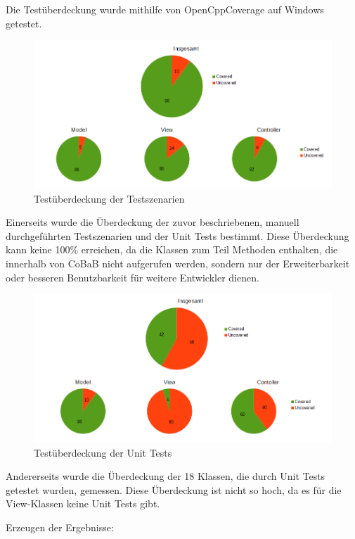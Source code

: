 Die Testüberdeckung wurde mithilfe von OpenCppCoverage auf Windows getestet.

\begin{figure}[H]
\includegraphics[width=1\linewidth]{img/Testszenarien}
\caption{Testüberdeckung der Testszenarien}
\label{fig:covCoBaB}
\end{figure}
Einerseits wurde die Überdeckung der zuvor beschriebenen, manuell durchgeführten Testszenarien und der Unit Tests bestimmt. Diese Überdeckung kann keine 100\% erreichen, da die Klassen zum Teil Methoden enthalten, die innerhalb von CoBaB nicht aufgerufen werden, sondern nur der Erweiterbarkeit oder besseren Benutzbarkeit für weitere Entwickler dienen. 

\begin{figure}[H]
\includegraphics[width=1\linewidth]{img/UnitTests}
\caption{Testüberdeckung der Unit Tests}
\label{fig:covTests}
\end{figure}
Andererseits wurde die Überdeckung der 18 Klassen, die durch Unit Tests getestet wurden, gemessen. Diese Überdeckung ist nicht so hoch, da es für die View-Klassen keine Unit Tests gibt. 


Erzeugen der Ergebnisse:


